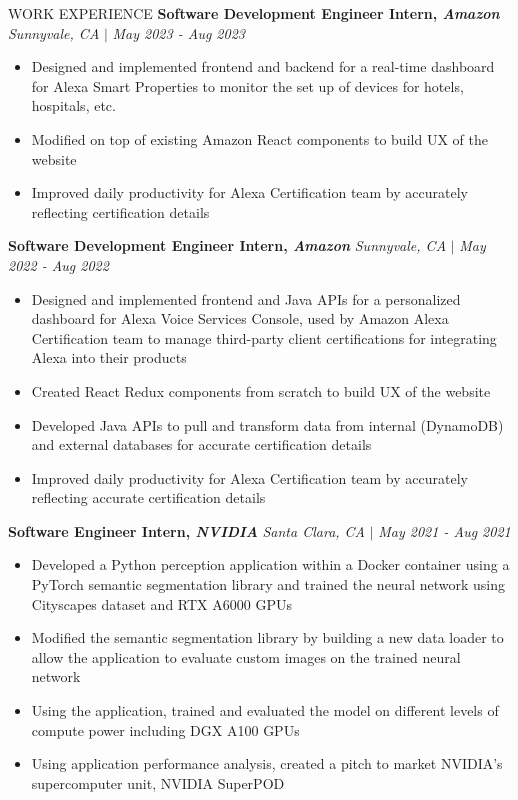 \documentclass{resume} %
\begin{document}
\begin{rSection}{WORK EXPERIENCE}
\textbf{Software Development Engineer Intern, \textit{Amazon}} \hfill {\it Sunnyvale, CA} \(|\)
{\it May 2023 - Aug 2023}
\begin{itemize}
    \itemsep -0.5em \vspace{-0.5em}
    \item Designed and implemented frontend and backend for a real-time dashboard for Alexa Smart Properties to monitor the set up of devices for hotels, hospitals, etc. 
    \item Modified on top of existing Amazon React components to build UX of the website
    \item Improved daily productivity for Alexa Certification team by accurately reflecting certification details
\end{itemize}

\textbf{Software Development Engineer Intern, \textit{Amazon}} \hfill {\it Sunnyvale, CA} \(|\) {\it May 2022 - Aug 2022}
\begin{itemize}
    \itemsep -0.5em \vspace{-0.5em}
    \item Designed and implemented frontend and Java APIs for a personalized dashboard for Alexa Voice Services Console, used by Amazon Alexa Certification team to manage third-party client certifications for integrating Alexa into their products
    \item Created React Redux components from scratch to build UX of the website
    \item Developed Java APIs to pull and transform data from internal (DynamoDB) and external databases for accurate certification details
    \item Improved daily productivity for Alexa Certification team by accurately reflecting accurate certification details
    \end{itemize}

\textbf{Software Engineer Intern, \textit{NVIDIA}} \hfill {\it Santa Clara, CA} \(|\) {\it May 2021 - Aug 2021}
\begin{itemize}
    \itemsep -0.5em \vspace{-0.5em}
    \item Developed a Python perception application within a Docker container using a PyTorch semantic segmentation library and trained the neural network using Cityscapes dataset and RTX A6000 GPUs
    \item Modified the semantic segmentation library by building a new data loader to allow the application to evaluate custom images on the trained neural network
    \item Using the application, trained and evaluated the model on different levels of compute power including DGX A100 GPUs
    \item Using application performance analysis, created a pitch to market NVIDIA's supercomputer unit, NVIDIA SuperPOD
\end{itemize}

\end{rSection} 
\end{document}
